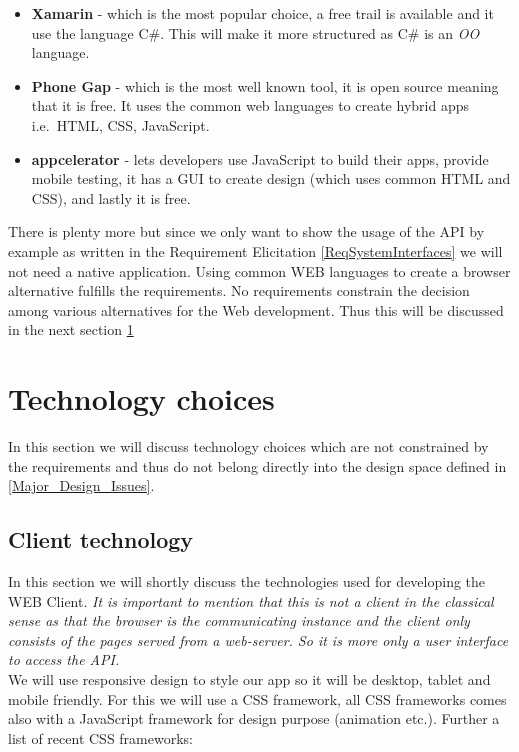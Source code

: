 \documentclass[a4paper,11pt]{article}
\begin{document}
\begin{itemize}
\item
  \textbf{Xamarin} - which is the most popular choice, a free trail is
  available and it use the language C\#. This will make it more
  structured as C\# is an \emph{OO} language.
\item
  \textbf{Phone Gap} - which is the most well known tool, it is open
  source meaning that it is free. It uses the common web languages to
  create hybrid apps i.e.~HTML, CSS, JavaScript.
\item
  \textbf{appcelerator} - lets developers use JavaScript to build their
  apps, provide mobile testing, it has a GUI to create design (which
  uses common HTML and CSS), and lastly it is free.
\end{itemize}

\noindent There is plenty more but since we only want to show the usage of the API by example as written in the Requirement Elicitation \ref{ReqSystemInterfaces} we will not need a native application. Using common WEB languages to create a browser alternative fulfills the requirements. No requirements constrain the decision among various alternatives for the Web development. Thus this will be discussed in the next section \ref{Technology_choices}

\newpage
\section{Technology choices} \label{Technology_choices}
In this section we will discuss technology choices which are not constrained by the requirements and thus do not belong directly into the design space defined in \ref{Major_Design_Issues}.

\subsection{Client technology}
 In this section we will shortly discuss the technologies used for developing the WEB Client. \textit{It is important to mention that this is not a client in the classical sense as that the browser is the communicating instance and the client only consists of the pages served from a web-server. So it is more only a user interface to access the API.} \\
 We will use responsive design to style our app so it will be desktop, tablet and mobile friendly. For this we will use a CSS framework, all CSS frameworks comes also with a JavaScript framework for design purpose (animation etc.). Further a list of recent CSS frameworks:
\end{document}
